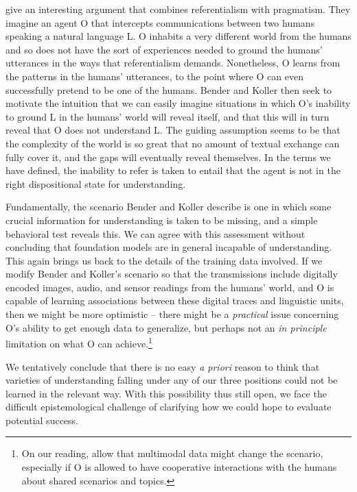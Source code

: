 \citet{bender2020climbing} give an interesting argument that combines referentialism with pragmatism. They imagine an agent O that intercepts communications between two humans speaking a natural language L. O inhabits a very different world from the humans and so does not have the sort of experiences needed to ground the humans’ utterances in the ways that referentialism demands. Nonetheless, O learns from the patterns in the humans’ utterances, to the point where O can even successfully pretend to be one of the humans. Bender and Koller then seek to motivate the intuition that we can easily imagine situations in which O’s inability to ground L in the humans’ world will reveal itself, and that this will in turn reveal that O does not understand L. The guiding assumption seems to be that the complexity of the world is so great that no amount of textual exchange can fully cover it, and the gaps will eventually reveal themselves. In the terms we have defined, the inability to refer is taken to entail that the agent is not in the right dispositional state for understanding.

Fundamentally, the scenario Bender and Koller describe is one in which some crucial information for understanding is taken to be missing, and a simple behavioral test reveals this. We can agree with this assessment without concluding that foundation models are in general incapable of understanding. This again brings us back to the details of the training data involved. If we modify Bender and Koller’s scenario so that the transmissions include digitally encoded images, audio, and sensor readings from the humans’ world, and O is capable of learning associations between these digital traces and linguistic units, then we might be more optimistic – there might be a \textit{practical} issue concerning O’s ability to get enough data to generalize, but perhaps not an \textit{in principle} limitation on what O can achieve.\footnote{On our reading, \citet{bender2020climbing} allow that multimodal data might change the scenario, especially if O is allowed to have cooperative interactions with the humans about shared scenarios and topics.}

We tentatively conclude that there is no easy \textit{a priori} reason to think that varieties of understanding falling under any of our three positions could not be learned in the relevant way. With this possibility thus still open, we face the difficult epistemological challenge of clarifying how we could hope to evaluate potential success.

